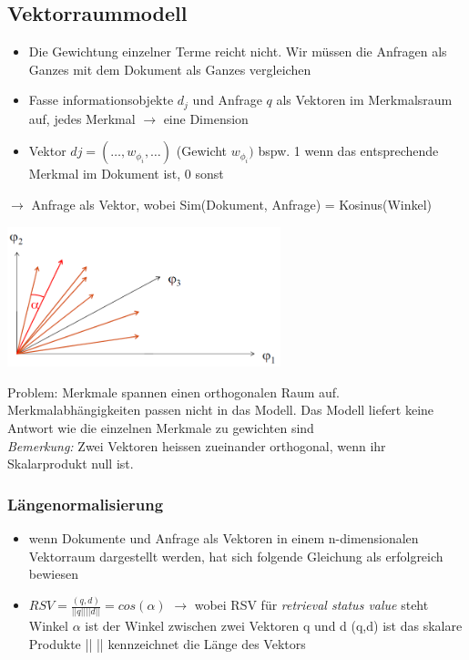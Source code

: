 \documentclass{report}
\newenvironment{Figure}
	{\par\medskip\noindent\minipage{\linewidth}}
	{\endminipage\par\medskip}
\theoremstyle{definition}
\theoremstyle{example}
\begin{document}
\subsection{Vektorraummodell}
\begin{itemize}
   \item Die Gewichtung einzelner Terme reicht nicht. Wir müssen die Anfragen als Ganzes mit dem Dokument als Ganzes vergleichen
   \item Fasse informationsobjekte $d_j$ und Anfrage $q$ als Vektoren im Merkmalsraum auf, jedes Merkmal $\rightarrow$ eine Dimension
   \item Vektor $dj = (\dots, w_{\phi_i}, \dots)$ (Gewicht $w_{\phi_i})$ bspw. 1 wenn das entsprechende Merkmal im Dokument ist, 0 sonst 
\end{itemize}

$\rightarrow$ Anfrage als Vektor, wobei Sim(Dokument, Anfrage) = Kosinus(Winkel)
\begin{Figure}
   \centering
    \includegraphics[width=300px]{img/Vektorraummodell.png}
        \label{fig:Dokumente als Vektoren im n-dimensionalen Raum}
\end{Figure}

Problem: Merkmale spannen einen orthogonalen Raum auf. Merkmalabhängigkeiten passen nicht in das Modell. Das Modell liefert keine Antwort wie die einzelnen Merkmale zu gewichten sind\\
\textit{Bemerkung:} Zwei Vektoren heissen zueinander orthogonal, wenn ihr Skalarprodukt null ist.

\subsubsection{Längenormalisierung}
\begin{itemize}
   \item wenn Dokumente und Anfrage als Vektoren in einem n-dimensionalen Vektorraum dargestellt werden, hat sich folgende Gleichung als erfolgreich bewiesen
   \item $RSV = \frac{(q,d)}{||q|| ||d||} = cos(\alpha)$ $\rightarrow$ wobei RSV für \textit{retrieval status value} steht
   \subitem Winkel $\alpha$ ist der Winkel zwischen zwei Vektoren q und d
   \subitem (q,d) ist das skalare Produkte
   \subitem || || kennzeichnet die Länge des Vektors 
\end{itemize}
\end{document}
